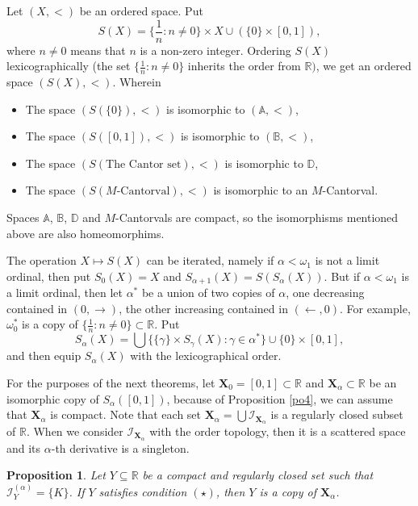 \documentclass[12pt,a4paper,leqno]{amsart}
\newtheorem{pro}[thm]{Proposition}
\theoremstyle{definition}
\begin{document}
Let $(X,<)$ be an ordered space. Put $$ S(X)= \{\frac1n\colon n\ne 0\} \times X \cup (\{0\} \times [0,1]), $$ where $n\ne 0$ means that $n$ is a non-zero integer.
Ordering $S(X)$  lexicographically (the set $\{\frac1n\colon n\ne 0\}$ inherits the order from  $\mathbb R)$, we get an ordered space $(S(X),<)$. Wherein
  \begin{itemize}
	\item [] The space $(S(\{0\}),< )$ is isomorphic to $(\mathbb A, <)$,
	\item [] The space $(S([0,1]),< )$ is isomorphic to $(\mathbb B, <)$,
	\item [] The space $(S(\mbox{The Cantor set}),< )$ is isomorphic to $\mathbb D$,
	\item [] The space $(S(\mbox{$M$-Cantorval}),< )$ is isomorphic to an $M$-Cantorval.
  \end{itemize}
	Spaces $\mathbb A$, $\mathbb B$, $\mathbb D$ and $M$-Cantorvals are compact, so  the isomorphisms mentioned above are also homeomorphims. 

The operation $X\mapsto S(X)$ can be iterated, namely if $\alpha < \omega_1$ is not a limit ordinal, then put $S_0(X)=X$ and $S_{\alpha +1}(X) =S(S_\alpha(X))$. But if $\alpha < \omega_1$ is  a limit ordinal, then let $\alpha^*$ be a union of two copies of $\alpha$, one decreasing contained in $(0, \rightarrow)$, the other increasing contained in $(\leftarrow, 0)$. For example,  $\omega_0^*$ is a copy of  $\{\frac1n\colon n\ne0\} \subset \mathbb R$. Put $$S_\alpha (X)= \bigcup \{\{\gamma\} \times S_\gamma(X)\colon \gamma \in \alpha^*\} \cup \{0\} \times [0,1], $$   and then equip $S_{\alpha}(X)$ with the lexicographical order.

For the purposes of the next theorems, let $\textbf{X}_0=[0,1]\subset \mathbb R$ and $\textbf{X}_\alpha \subset \mathbb R$ be an isomorphic copy of $S_\alpha([0,1])$, because of Proposition \ref{po4}, we can assume that  $\textbf{X}_\alpha$ is compact.   Note that each set $\textbf{X}_\alpha = \bigcup \mathcal I_{\textbf{X}_\alpha}$ is a regularly closed subset of $\mathbb R$. When we consider $\mathcal I_{\textbf{X}_\alpha}$  with  the order topology, then it is a scattered space and its $\alpha$-th derivative  is a singleton. 

\begin{pro}\label{p24} Let $Y\subseteq \mathbb R$ be a compact and regularly closed set such that $\mathcal I_{{Y}}^{(\alpha)} = \{K\}$. If $Y$ satisfies condition $(\star)$, then $Y$ is a copy of $\mathbf{X}_\alpha$. \end{pro}
\end{document}
